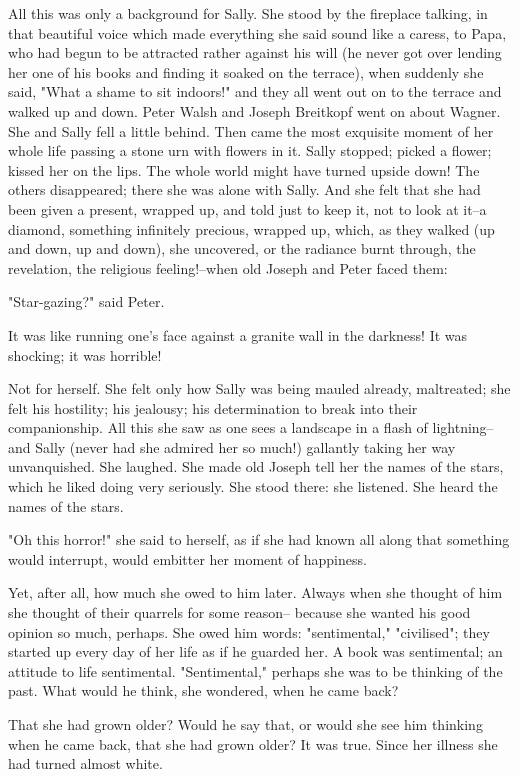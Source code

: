 \documentclass[lang=cn,10pt]{elegantbook}
\begin{document}
All this was only a background for Sally.  She stood by the
fireplace talking, in that beautiful voice which made everything
she said sound like a caress, to Papa, who had begun to be
attracted rather against his will (he never got over lending her
one of his books and finding it soaked on the terrace), when
suddenly she said, "What a shame to sit indoors!" and they all went
out on to the terrace and walked up and down.  Peter Walsh and
Joseph Breitkopf went on about Wagner.  She and Sally fell a little
behind.  Then came the most exquisite moment of her whole life
passing a stone urn with flowers in it.  Sally stopped; picked a
flower; kissed her on the lips.  The whole world might have turned
upside down!  The others disappeared; there she was alone with
Sally.  And she felt that she had been given a present, wrapped up,
and told just to keep it, not to look at it--a diamond, something
infinitely precious, wrapped up, which, as they walked (up and
down, up and down), she uncovered, or the radiance burnt through,
the revelation, the religious feeling!--when old Joseph and Peter
faced them:

"Star-gazing?" said Peter.

It was like running one's face against a granite wall in the
darkness!  It was shocking; it was horrible!

Not for herself.  She felt only how Sally was being mauled already,
maltreated; she felt his hostility; his jealousy; his determination
to break into their companionship.  All this she saw as one sees a
landscape in a flash of lightning--and Sally (never had she admired
her so much!) gallantly taking her way unvanquished.  She laughed.
She made old Joseph tell her the names of the stars, which he liked
doing very seriously.  She stood there: she listened.  She heard
the names of the stars.

"Oh this horror!" she said to herself, as if she had known all
along that something would interrupt, would embitter her moment of
happiness.

Yet, after all, how much she owed to him later.  Always when she
thought of him she thought of their quarrels for some reason--
because she wanted his good opinion so much, perhaps.  She owed him
words: "sentimental," "civilised"; they started up every day of her
life as if he guarded her.  A book was sentimental; an attitude to
life sentimental.  "Sentimental," perhaps she was to be thinking of
the past.  What would he think, she wondered, when he came back?

That she had grown older?  Would he say that, or would she see him
thinking when he came back, that she had grown older?  It was true.
Since her illness she had turned almost white.
\end{document}
